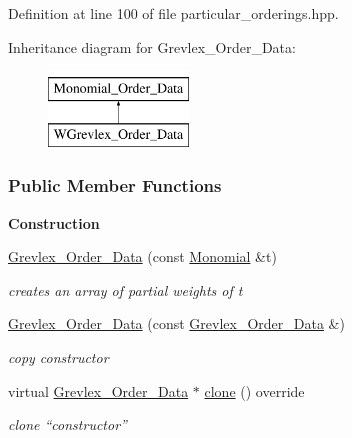Definition at line 100 of file particular\+\_\+orderings.\+hpp.

Inheritance diagram for Grevlex\+\_\+\+Order\+\_\+\+Data\+:\begin{figure}[H]
\begin{center}
\leavevmode
\includegraphics[height=2.000000cm]{group__orderinggroup}
\end{center}
\end{figure}
\subsubsection*{Public Member Functions}
\begin{Indent}\textbf{ Construction}\par
\begin{DoxyCompactItemize}
\item 
\hyperlink{group__orderinggroup_a61000659db1597c1fb7f149deb0d952c}{Grevlex\+\_\+\+Order\+\_\+\+Data} (const \hyperlink{group__polygroup_class_monomial}{Monomial} \&t)
\begin{DoxyCompactList}\small\item\em creates an array of partial weights of {\ttfamily t} \end{DoxyCompactList}\item 
\mbox{\label{group__orderinggroup_a53b3cafb2c36cea8c58aba05eeb422ea}} 
\hyperlink{group__orderinggroup_a53b3cafb2c36cea8c58aba05eeb422ea}{Grevlex\+\_\+\+Order\+\_\+\+Data} (const \hyperlink{group__orderinggroup_class_grevlex___order___data}{Grevlex\+\_\+\+Order\+\_\+\+Data} \&)
\begin{DoxyCompactList}\small\item\em copy constructor \end{DoxyCompactList}\item 
\mbox{\label{group__orderinggroup_a001fd11460120bb1df89f4960ec9d800}} 
virtual \hyperlink{group__orderinggroup_class_grevlex___order___data}{Grevlex\+\_\+\+Order\+\_\+\+Data} $\ast$ \hyperlink{group__orderinggroup_a001fd11460120bb1df89f4960ec9d800}{clone} () override
\begin{DoxyCompactList}\small\item\em clone ``constructor'' \end{DoxyCompactList}\end{DoxyCompactItemize}
\end{Indent}
